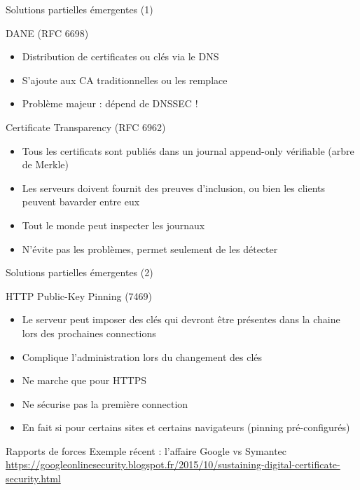 \documentclass{mpg-ep-slides}
\begin{document}
\begin{frame}{Solutions partielles émergentes (1)}
  \begin{block}{DANE (RFC 6698)}
    \begin{itemize}
      \item Distribution de certificates ou clés via le DNS
      \item S'ajoute aux CA traditionnelles ou les remplace
      \item Problème majeur : dépend de DNSSEC !
    \end{itemize}
  \end{block}

  \begin{block}{Certificate Transparency (RFC 6962)}
    \begin{itemize}
      \item Tous les certificats sont publiés dans un journal append-only
        vérifiable (arbre de Merkle)
      \item Les serveurs doivent fournit des preuves d'inclusion, ou bien les
        clients peuvent bavarder entre eux
      \item Tout le monde peut inspecter les journaux
      \item N'évite pas les problèmes, permet seulement de les détecter
    \end{itemize}
  \end{block}
\end{frame}

\begin{frame}{Solutions partielles émergentes (2)}
  \begin{block}{HTTP Public-Key Pinning (7469)}
    \begin{itemize}
      \item Le serveur peut imposer des clés qui devront être présentes dans
        la chaine lors des prochaines connections
      \item Complique l'administration lors du changement des clés
      \item Ne marche que pour HTTPS
      \item Ne sécurise pas la première connection
      \item En fait si pour certains sites et certains navigateurs (pinning
        pré-configurés)
    \end{itemize}
  \end{block}

  \begin{block}{Rapports de forces}
    Exemple récent : l'affaire Google vs Symantec
    \url{https://googleonlinesecurity.blogspot.fr/2015/10/sustaining-digital-certificate-security.html}
  \end{block}
\end{frame}
\end{document}
